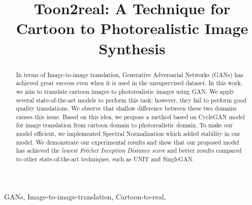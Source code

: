 \documentclass[conference]{IEEEtran}
\begin{document}
\title{Toon2real: A Technique for Cartoon to Photorealistic Image Synthesis\\
}

\author{
}

\maketitle

\begin{abstract}
In terms of Image-to-image translation, Generative Adversarial Networks (GANs) has achieved great success even when it is used in the unsupervised dataset. In this work, we aim to translate cartoon images to photorealistic images using GAN.
We apply several state-of-the-art models to perform this task; however, they fail to perform good quality translations.
We observe that shallow difference between these two domains causes this issue. Based on this idea, we propose a method based on CycleGAN model for image translation from cartoon domain to photorealistic domain. To make our model efficient, we implemented Spectral Normalization which added stability in our model. We demonstrate our experimental results and show that our proposed model has achieved the \textit{lowest Fr\'echet Inception Distance score} and better results compared to other state-of-the-art techniques, such as UNIT and SingleGAN.
\end{abstract}

\begin{IEEEkeywords}
GANs, Image-to-image-translation, Cartoon-to-real,
\end{IEEEkeywords}
\end{document}
